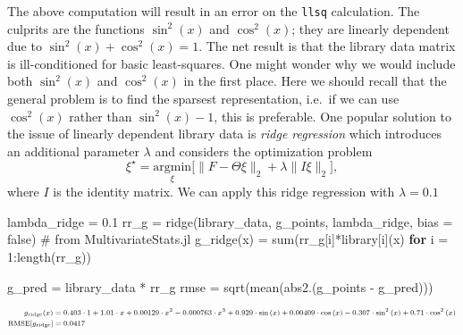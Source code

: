 \documentclass[
]{article}
\newenvironment{Shaded}{\begin{snugshade}}{\end{snugshade}}
\newcommand{\CommentTok}[1]{\textcolor[rgb]{0.37,0.37,0.37}{#1}}
\newcommand{\ConstantTok}[1]{\textcolor[rgb]{0.56,0.35,0.01}{#1}}
\newcommand{\ControlFlowTok}[1]{\textcolor[rgb]{0.00,0.23,0.31}{\textbf{#1}}}
\newcommand{\FloatTok}[1]{\textcolor[rgb]{0.68,0.00,0.00}{#1}}
\newcommand{\FunctionTok}[1]{\textcolor[rgb]{0.28,0.35,0.67}{#1}}
\newcommand{\NormalTok}[1]{\textcolor[rgb]{0.00,0.23,0.31}{#1}}
\newcommand{\OperatorTok}[1]{\textcolor[rgb]{0.37,0.37,0.37}{#1}}
\begin{document}
The above computation will result in an error on the \texttt{llsq}
calculation. The culprits are the functions \(\sin^2(x)\) and
\(\cos^2(x)\); they are linearly dependent due to
\(\sin^2(x) + \cos^2(x) = 1\). The net result is that the library data
matrix is ill-conditioned for basic least-squares. One might wonder why
we would include both \(\sin^2(x)\) and \(\cos^2(x)\) in the first
place. Here we should recall that the general problem is to find the
sparsest representation, i.e.~if we can use \(\cos^2(x)\) rather than
\(\sin^2(x) - 1\), this is preferable. One popular solution to the issue
of linearly dependent library data is \emph{ridge regression}
\cite{hoerl1970ridge} which introduces an additional parameter
\(\lambda\) and considers the optimization problem \begin{equation}
\xi^\star = \underset{\xi}{\text{argmin}}\bigg[ \lVert F - \Theta \xi \rVert_{2} + \lambda \lVert I \xi \rVert_{2} \bigg],
\end{equation} where \(I\) is the identity matrix. We can apply this
ridge regression with \(\lambda = 0.1\)

\begin{Shaded}
\begin{Highlighting}[]
\NormalTok{lambda\_ridge }\OperatorTok{=} \FloatTok{0.1}
\NormalTok{rr\_g }\OperatorTok{=} \FunctionTok{ridge}\NormalTok{(library\_data, g\_points, lambda\_ridge, bias }\OperatorTok{=} \ConstantTok{false}\NormalTok{) }\CommentTok{\# from MultivariateStats.jl}
\FunctionTok{g\_ridge}\NormalTok{(x) }\OperatorTok{=} \FunctionTok{sum}\NormalTok{(rr\_g[i]}\OperatorTok{*}\NormalTok{library[i](x) }\ControlFlowTok{for}\NormalTok{ i }\OperatorTok{=} \FloatTok{1}\OperatorTok{:}\FunctionTok{length}\NormalTok{(rr\_g))}

\NormalTok{g\_pred }\OperatorTok{=}\NormalTok{ library\_data }\OperatorTok{*}\NormalTok{ rr\_g}
\NormalTok{rmse }\OperatorTok{=} \FunctionTok{sqrt}\NormalTok{(}\FunctionTok{mean}\NormalTok{(}\FunctionTok{abs2}\NormalTok{.(g\_points }\OperatorTok{{-}}\NormalTok{ g\_pred)))}
\end{Highlighting}
\end{Shaded}

\begin{subequations} \label{eq:g-ridge} \scriptsize \begin{align}    g_{\text{ridge}}(x) &= 0.403 \cdot 1 + 1.01 \cdot x + 0.00129 \cdot x^{2} -0.000763 \cdot x^{3} + 0.929 \cdot \sin\left( x \right) + 0.00409 \cdot \cos\left( x \right) -0.307 \cdot \sin^{2}\left( x \right) + 0.71 \cdot \cos^{2}\left( x \right) \\
    \text{RMSE}[g_{\text{ridge}}] &= 0.0417 \end{align} \end{subequations}
\end{document}
